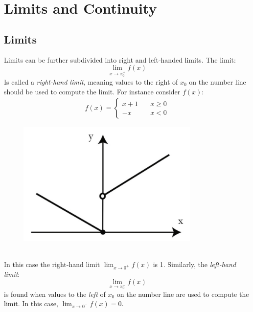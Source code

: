 \documentclass{report}
\begin{document}

\section{Limits and Continuity} %
\label{fundamentals:limits and continuity}

\subsection{Limits} %
\label{fundamentals:limits and continuity:limits}
Limits can be further subdivided into right and left-handed limits. The limit:
\begin{equation*}
\lim_{x\to x_0^+}f(x)
\end{equation*}
Is called a \textit{right-hand limit}, meaning values to the right of $x_0$ on the number
line should be used to compute the limit. For instance consider $f(x)$:
\begin{align*}
f(x)=
\begin{cases} 
x+1 &\quad x \geq 0 \\
-x  &\quad x < 0
\end{cases}
\end{align*}
\begin{figure}[h]
\includegraphics[width=9cm]{Capture3}
\centering
\end{figure}\\
In this case the right-hand limit $\lim_{x\to 0^+}f(x)$ is 1. Similarly, the 
\textit{left-hand limit}:
\begin{equation*}
\lim_{x\to x_0^-}f(x)
\end{equation*} 
is found when values to the \textit{left} of $x_0$ on the number line
are used to compute the limit. In this case, $\lim_{x\to 0^-}f(x)=0$.

\newpage
\end{document}
